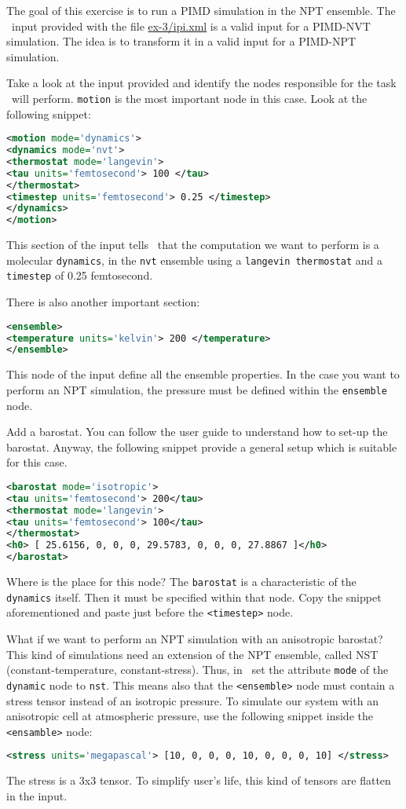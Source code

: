 \documentclass{article}
\begin{document}
\begin{Exercise}[label={inputs},title={PIMD-NPT simulation of ice}]
The goal of this exercise is to run a PIMD simulation in the NPT
ensemble. The \ipi\ input provided with the file \url{ex-3/ipi.xml} is
a valid input for a PIMD-NVT simulation. The idea is to transform it
in a valid input for a PIMD-NPT simulation.

\Question
Take a look at the input provided and identify the nodes responsible
for the task \ipi\ will perform.
\texttt{motion} is the most important node in this case.
Look at the following snippet:
\begin{lstlisting}[language=xml]
<motion mode='dynamics'>
<dynamics mode='nvt'>
<thermostat mode='langevin'>
<tau units='femtosecond'> 100 </tau>
</thermostat>
<timestep units='femtosecond'> 0.25 </timestep>
</dynamics>
</motion>
\end{lstlisting}
This section of the input tells \ipi\ that the computation we want to
perform is a molecular \texttt{dynamics}, in the \texttt{nvt} ensemble
using a \texttt{langevin thermostat} and a \texttt{timestep} of 0.25
femtosecond.

There is also another important section:
\begin{lstlisting}[language=xml]
<ensemble>
<temperature units='kelvin'> 200 </temperature>
</ensemble>
\end{lstlisting}
This node of the input define all the ensemble properties. In the
case you want to perform an NPT simulation, the pressure must be
defined within the \texttt{ensemble} node.


\Question
Add a barostat. You can follow the user guide to understand how to
set-up the barostat. Anyway, the following snippet provide a general setup
which is suitable for this case.
\begin{lstlisting}[language=xml]
<barostat mode='isotropic'>
<tau units='femtosecond'> 200</tau>
<thermostat mode='langevin'>
<tau units='femtosecond'> 100</tau>
</thermostat>
<h0> [ 25.6156, 0, 0, 0, 29.5783, 0, 0, 0, 27.8867 ]</h0>
</barostat>
\end{lstlisting}
Where is the place for this node? The \texttt{barostat} is a
characteristic of the \texttt{dynamics} itself. Then it must be
specified within that node. Copy the snippet aforementioned and paste
just before the \texttt{<timestep>} node.


\Question What if we want to perform an NPT simulation with an
anisotropic barostat? This kind of simulations need an extension of
the NPT ensemble, called NST (constant-temperature,
constant-stress). Thus, in \ipi\ set the attribute \texttt{mode} of
the \texttt{dynamic} node to \texttt{nst}. This means also that the
\texttt{<ensemble>} node must contain a stress tensor instead of an
isotropic pressure. To simulate our system with an anisotropic cell at
atmospheric pressure, use the following snippet inside the
\texttt{<ensamble>} node:
\begin{lstlisting}[language=xml]
<stress units='megapascal'> [10, 0, 0, 0, 10, 0, 0, 0, 10] </stress>
\end{lstlisting}
The stress is a 3x3 tensor. To simplify user's life, this kind of tensors are
flatten in the \ipi input.


\end{Exercise}
\end{document}
